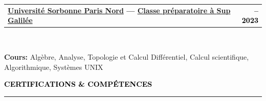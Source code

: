 \documentclass[10pt,english,french]{article}
\makeatletter
\newcommand{\certificateIcon}[1][black]{\textcolor{#1}{\faClipboard}}
\newlength{\mpwidth}
\newcommand{\cvsection}[1]{
    \vspace{4pt}
    \textbf{\fontsize{9pt}{10pt}\selectfont \textcolor{black}{#1}}
    \vspace{6pt}
    \hrule
    \vspace{6pt}
}
\newcommand{\cvtextnotab}[1]{
    \parbox{1\mpwidth}{#1}
}
\newcommand{\cvevent}[2]{
    \vspace{2pt}
    \parbox{\mpwidth}{
        \begin{tabular*}{1\mpwidth}{@{\extracolsep{\fill}} l r}
            \textcolor{black}{\textbf{\fontsize{11}{12}\selectfont #1}} & \textcolor{black}{\textbf{\fontsize{12}{12}\selectfont #2}} \\
        \end{tabular*}\\[-8pt] %
    }
}
\newcommand{\cvsubevent}[2]{
    \parbox{\mpwidth}{
        \begin{tabular*}{1\mpwidth}{@{\extracolsep{\fill}} l r}
            \textcolor{black}{\textit{\fontsize{10}{12}\selectfont #1}} & \textcolor{black}{\textit{\fontsize{10}{12}\selectfont #2}} \\
        \end{tabular*}\\[-8pt] %
    }
    \vspace{-10pt}
}
\makeatother
\begin{document}
\cvevent{\href{https://www.univ-spn.fr}{Université Sorbonne Paris Nord} --- \href{https://www.sup-galilee.univ-paris13.fr/index.php/formation/cp2i/}{Classe préparatoire à \textbf{Sup Galilée}}}{\fontsize{11pt}{11pt}\selectfont 2021\hspace{5pt}--\hspace{5pt}2023}

\vspace{-10pt}
\cvtextnotab{\textbf{Cours\!:} Algèbre, Analyse, Topologie et Calcul Différentiel, Calcul scientifique, Algorithmique, Systèmes UNIX}



\vspace{-14pt}
\cvsection{\certificateIcon[black]\hspace{4pt}CERTIFICATIONS \& COMPÉTENCES}
\end{document}
